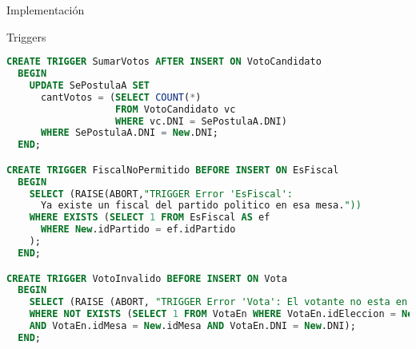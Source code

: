 \begin{section}{Implementaci\'on}
\begin{subsection}{Triggers}
\begin{lstlisting}[language=SQL, basicstyle=\footnotesize]
CREATE TRIGGER SumarVotos AFTER INSERT ON VotoCandidato
  BEGIN       
    UPDATE SePostulaA SET 
      cantVotos = (SELECT COUNT(*)
                   FROM VotoCandidato vc 
                   WHERE vc.DNI = SePostulaA.DNI)
      WHERE SePostulaA.DNI = New.DNI;     
  END;

CREATE TRIGGER FiscalNoPermitido BEFORE INSERT ON EsFiscal  
  BEGIN
    SELECT (RAISE(ABORT,"TRIGGER Error 'EsFiscal': 
      Ya existe un fiscal del partido politico en esa mesa."))
    WHERE EXISTS (SELECT 1 FROM EsFiscal AS ef 
      WHERE New.idPartido = ef.idPartido
    );    
  END;

CREATE TRIGGER VotoInvalido BEFORE INSERT ON Vota 
  BEGIN
    SELECT (RAISE (ABORT, "TRIGGER Error 'Vota': El votante no esta en el padron."))
    WHERE NOT EXISTS (SELECT 1 FROM VotaEn WHERE VotaEn.idEleccion = New.idEleccion
    AND VotaEn.idMesa = New.idMesa AND VotaEn.DNI = New.DNI);
  END;

\end{lstlisting} 

\end{subsection}
\end{section}

